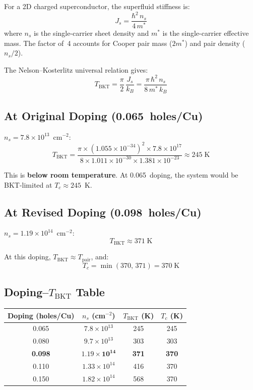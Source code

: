 \documentclass[11pt, a4paper]{article}
\begin{document}
For a 2D charged superconductor, the superfluid stiffness is:
\[
  J_s = \frac{\hbar^2\,n_s}{4\,m^*}
\]
where $n_s$ is the single-carrier sheet density and $m^*$ is
the single-carrier effective mass. The factor of~4 accounts for
Cooper pair mass ($2m^*$) and pair density ($n_s/2$).

The Nelson--Kosterlitz universal relation gives:
\[
  T_{\text{BKT}} = \frac{\pi}{2}\,\frac{J_s}{k_B}
    = \frac{\pi\,\hbar^2\,n_s}{8\,m^*\,k_B}
\]

\subsection{At Original Doping (0.065~holes/Cu)}

$n_s = 7.8 \times 10^{13}$~cm$^{-2}$:
\[
  T_{\text{BKT}} = \frac{\pi \times (1.055 \times 10^{-34})^2
    \times 7.8 \times 10^{17}}
    {8 \times 1.011 \times 10^{-30}
    \times 1.381 \times 10^{-23}}
    \approx 245\;\text{K}
\]

This is \textbf{below room temperature}. At 0.065~doping,
the system would be BKT-limited at $T_c \approx 245$~K.

\subsection{At Revised Doping (0.098~holes/Cu)}

$n_s = 1.19 \times 10^{14}$~cm$^{-2}$:
\[
  T_{\text{BKT}} \approx 371\;\text{K}
\]

At this doping, $T_{\text{BKT}} \approx T_{\text{pair}}$, and:
\[
  T_c = \min(370,\, 371) = 370\;\text{K}
\]

\subsection{Doping--$T_{\text{BKT}}$ Table}

\begin{center}
\begin{tabular}{@{}cccc@{}}
\toprule
Doping (holes/Cu) & $n_s$ (cm$^{-2}$) & $T_{\text{BKT}}$ (K) &
  $T_c$ (K) \\
\midrule
0.065 & $7.8 \times 10^{13}$ & 245 & 245 \\
0.080 & $9.7 \times 10^{13}$ & 303 & 303 \\
\textbf{0.098} & $\mathbf{1.19 \times 10^{14}}$ &
  \textbf{371} & \textbf{370} \\
0.110 & $1.33 \times 10^{14}$ & 416 & 370 \\
0.150 & $1.82 \times 10^{14}$ & 568 & 370 \\
\bottomrule
\end{tabular}
\end{center}
\end{document}
